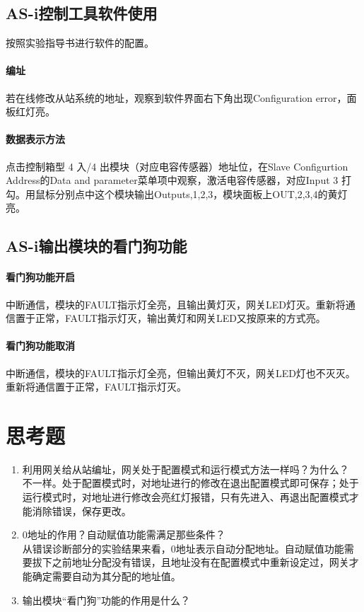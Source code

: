 \subsection{AS-i控制工具软件使用}
按照实验指导书进行软件的配置。
\paragraph{编址}
若在线修改从站系统的地址，观察到软件界面右下角出现{\ttfamily Configuration error}，面板红灯亮。
\paragraph{数据表示方法}
点击控制箱型 4 入/4 出模块（对应电容传感器）地址位，在{\ttfamily Slave Configurtion Address}的{\ttfamily Data and parameter}菜单项中观察，激活电容传感器，对应Input 3 打勾。用鼠标分别点中这个模块输出Outputs,1,2,3，模块面板上OUT,2,3,4的黄灯亮。

\subsection{AS-i输出模块的看门狗功能}
\paragraph{看门狗功能开启}
中断通信，模块的FAULT指示灯全亮，且输出黄灯灭，网关LED灯灭。重新将通信置于正常，FAULT指示灯灭，输出黄灯和网关LED又按原来的方式亮。
\paragraph{看门狗功能取消}
中断通信，模块的FAULT指示灯全亮，但输出黄灯不灭，网关LED灯也不灭灭。重新将通信置于正常，FAULT指示灯灭。
\section{思考题}
\begin{enumerate}
\item 利用网关给从站编址，网关处于配置模式和运行模式方法一样吗？为什么？\\
不一样。处于配置模式时，对地址进行的修改在退出配置模式即可保存；处于运行模式时，对地址进行修改会亮红灯报错，只有先进入、再退出配置模式才能消除错误，保存更改。
\item 0地址的作用？自动赋值功能需满足那些条件？\\
从错误诊断部分的实验结果来看，0地址表示自动分配地址。自动赋值功能需要拔下之前地址分配没有错误，且地址没有在配置模式中重新设定过，网关才能确定需要自动为其分配的地址值。
\item 输出模块“看门狗”功能的作用是什么？\\

\end{enumerate}
